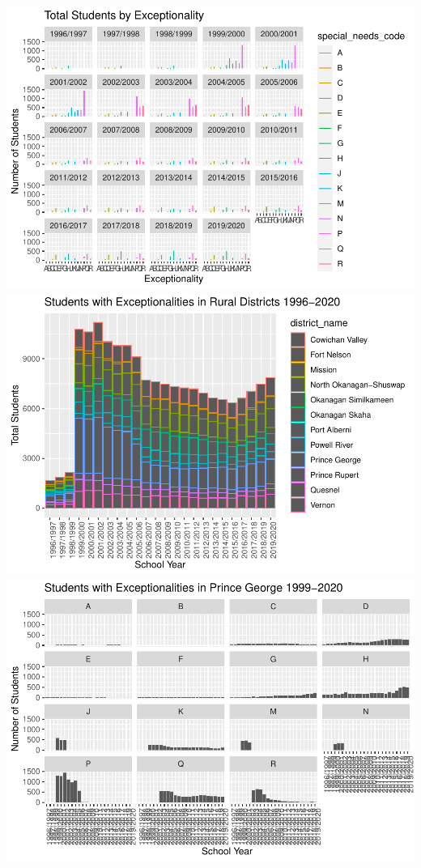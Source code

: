 \documentclass[
  english,
  man]{apa6}
\begin{document}
\includegraphics{Final_project_files/figure-latex/rural play-1.pdf} \includegraphics{Final_project_files/figure-latex/rural play-2.pdf} \includegraphics{Final_project_files/figure-latex/rural play-3.pdf}
\end{document}
